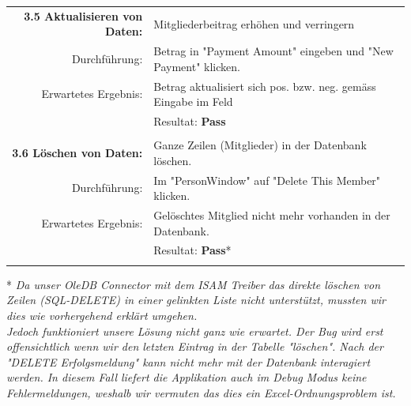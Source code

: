 \documentclass{article}
\begin{document}
\begin{tabular}{r|p{12cm}}
	\textbf{3.5 Aktualisieren von Daten:} & Mitgliederbeitrag erhöhen und verringern\\
		Durchführung:			& Betrag in "Payment Amount" eingeben und "New Payment" klicken.\\
		Erwartetes Ergebnis: 	& Betrag aktualisiert sich pos. bzw. neg. gemäss Eingabe im Feld \\
								& Resultat:  \textbf{Pass}\hspace{7.7cm} \color{green} {\ding{51}} \\
								\\	
	\textbf{3.6 Löschen von Daten:} & Ganze Zeilen (Mitglieder) in der Datenbank löschen.\\
		Durchführung:			& Im "PersonWindow" auf "Delete This Member" klicken.\\
		Erwartetes Ergebnis: 	& Gelöschtes Mitglied nicht mehr vorhanden in der Datenbank. \\
								& Resultat:  \textbf{Pass}*\hspace{7.6cm} \color{carrotorange} {\ding{51}} \\
								\\								
	
\end{tabular}

* \textit{Da unser OleDB Connector mit dem ISAM Treiber das direkte löschen von Zeilen (SQL-DELETE) in einer gelinkten Liste nicht unterstützt, mussten wir dies wie vorhergehend erklärt umgehen. 
\\
Jedoch funktioniert unsere Lösung nicht ganz wie erwartet. Der Bug wird erst offensichtlich wenn wir den letzten Eintrag in der Tabelle "löschen". Nach der "DELETE Erfolgsmeldung" kann nicht mehr mit der Datenbank interagiert werden. In diesem Fall liefert die Applikation auch im Debug Modus keine Fehlermeldungen, weshalb wir vermuten das dies ein Excel-Ordnungsproblem ist.} \\
\end{document}
